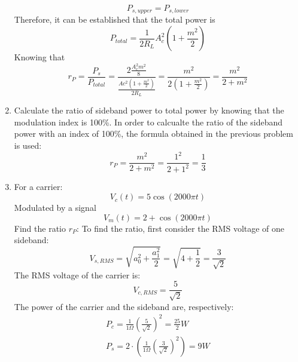 \begin{enumerate}
\begin{equation}
              P_{s,upper} = P_{s,lower}
          \end{equation}
          Therefore, it can be established that the total power is
          \begin{equation}
              P_{total} = \frac{1}{2R_L}A_c^2(1+\frac{m^2}{2})
          \end{equation}
          Knowing that
          \begin{equation}
              r_P = \frac{P_s}{P_{total}} = \frac{2\frac{A_c^2m^2}{8}}{\frac{Ac^2(1+\frac{m^2}{2})}{2R_L}} = \frac{m^2}{2(1+\frac{m^2}{2})} = \frac{m^2}{2+m^2}
          \end{equation}
    \item Calculate the ratio of sideband power to total power by knowing that the modulation index is 100\%.
          In order to calcualte the ratio of the sideband power with an index of 100\%, the formula obtained in the previous problem is used:
          \begin{equation}
              r_P = \frac{m^2}{2+m^2} = \frac{1^2}{2+1^2} = \frac{1}{3}
          \end{equation}
    \item For a carrier:
          \begin{equation}
              V_c(t) = 5\cos(2000\pi t)
          \end{equation}
          Modulated by a signal
          \begin{equation}
              V_m(t) = 2 + \cos(2000\pi t)
          \end{equation}
          Find the ratio $r_P$:
          To find the ratio, first consider the RMS voltage of one sideband:
          \begin{equation}
              V_{s,RMS} = \sqrt{a_0^2 + \frac{a_1^2}{2}} = \sqrt{4 + \frac{1}{2}} = \frac{3}{\sqrt{2}}
          \end{equation}
          The RMS voltage of the carrier is:
          \begin{equation}
              V_{c,RMS} = \frac{5}{\sqrt{2}}
          \end{equation}
          The power of the carrier and the sideband are, respectively:
          \begin{equation}
              \begin{gathered}
                  P_c = \frac{1}{1\Omega}(\frac{5}{\sqrt{2}})^2 = \frac{25}{2}W \\
                  P_{s} = 2\cdot \left(\frac{1}{1\Omega}\left(\frac{3}{\sqrt{2}}\right)^2\right) = 9W

\end{gathered}
\end{equation}
\end{enumerate}
